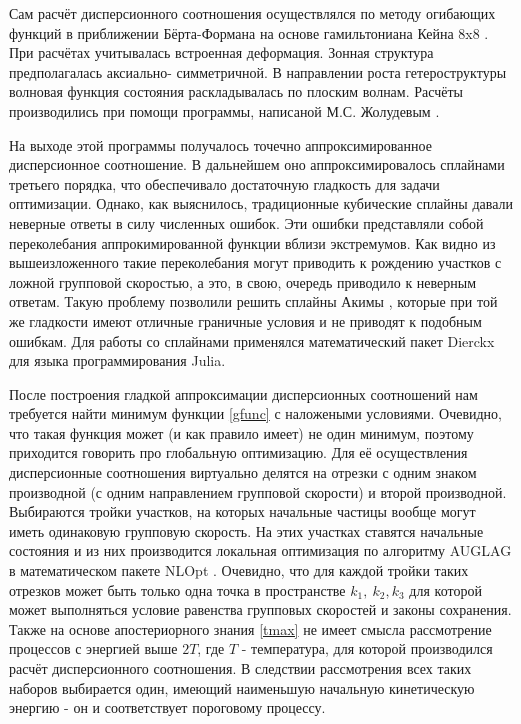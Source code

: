 \documentclass[../main.tex]{subfiles}
\begin{document}
        Сам расчёт дисперсионного соотношения осуществлялся по методу огибающих функций
        в приближении Бёрта-Формана на основе гамильтониана Кейна 8x8 \cite{Novik:2005}. При расчётах
        учитывалась встроенная деформация. Зонная структура предполагалась аксиально-
        симметричной. В направлении роста гетероструктуры волновая функция состояния
        раскладывалась по плоским волнам. Расчёты производились при помощи программы,
        написаной М.С. Жолудевым \cite{Zholudev:PRB:2012}.

        На выходе этой программы получалось точечно аппроксимированное дисперсионное 
        соотношение. В дальнейшем оно аппроксимировалось сплайнами третьего порядка,
        что обеспечивало достаточную гладкость для задачи оптимизации. Однако, 
        как выяснилось, традиционные кубические сплайны давали неверные ответы в силу
        численных ошибок. Эти ошибки представляли собой переколебания аппрокимированной
        функции вблизи экстремумов. Как видно из вышеизложенного такие переколебания 
        могут приводить к рождению участков с ложной групповой скоростью, а это, в свою,
        очередь приводило к неверным ответам. Такую проблему позволили решить сплайны 
        Акимы \cite{AkimaSplines}, которые при той же гладкости имеют отличные граничные 
        условия и не приводят к подобным ошибкам. Для работы со сплайнами применялся
        математический пакет Dierckx \cite{Dierckx} для языка программирования 
        Julia. 

        После построения гладкой аппроксимации дисперсионных соотношений нам требуется 
        найти минимум функции \eqref{gfunc} с наложеными условиями. Очевидно, что такая 
        функция может (и как правило имеет) не один минимум, поэтому приходится говорить
        про глобальную оптимизацию. Для её осуществления дисперсионные соотношения виртуально
        делятся на отрезки с одним знаком производной (с одним направлением групповой скорости)
        и второй производной. Выбираются тройки участков, на которых начальные частицы вообще 
        могут иметь одинаковую групповую скорость. На этих участках ставятся начальные состояния
        и из них производится локальная оптимизация по алгоритму AUGLAG \cite{AuglagOptim} в математическом пакете NLOpt
        \cite{NLopt}. Очевидно, что для каждой тройки таких отрезков
        может быть только одна точка в пространстве $k_1,~k_2,k_3$ для которой может выполняться
        условие равенства групповых скоростей и законы сохранения. Также на основе апостериорного 
        знания \eqref{tmax} не имеет смысла рассмотрение 
        процессов с энергией выше $2T$, где $T$ - температура, для которой производился расчёт 
        дисперсионного соотношения. В следствии рассмотрения всех 
        таких наборов выбирается один, имеющий наименьшую начальную кинетическую энергию - он и 
        соответствует пороговому процессу.
\end{document}
